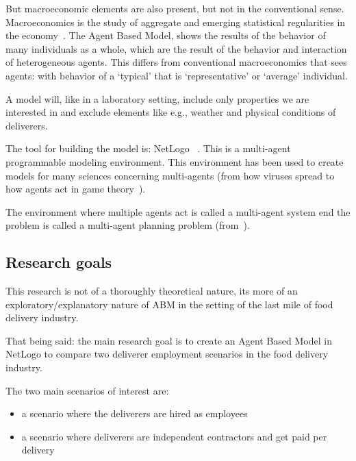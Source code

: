 But macroeconomic elements are also present, but not in the conventional sense.
Macroeconomics is the study of aggregate and emerging statistical regularities in the economy~\cite{cincotti2022we}.
The Agent Based Model, shows the results of the behavior of many individuals as a whole, which are the result of the behavior and interaction of heterogeneous agents.
This differs from conventional macroeconomics that sees agents: with behavior of a `typical' that is `representative' or `average' individual.

A model will, like in a laboratory setting, include only properties we are interested in and exclude elements like e.g., weather and physical conditions of deliverers.

The tool for building the model is: NetLogo ~\cite{NetLogo2024}.
This is a multi-agent programmable modeling environment.
This environment has been used to create models for many sciences concerning multi-agents (from how viruses spread to how agents act in game theory~\cite{r2019agent}).

The environment where multiple agents act is called a multi-agent system end the problem is called a multi-agent planning problem (from~\cite{russell2016artificial}).

\subsection{Research goals}\label{subsec:research-goals}
This research is not of a thoroughly theoretical nature, its more of an exploratory/explanatory nature of ABM in the setting of the last mile of food delivery industry.

That being said: the main research goal is to create an Agent Based Model in NetLogo to compare two deliverer employment scenarios in the food delivery industry.

The two main scenarios of interest are:
\begin{itemize}
    \item a scenario where the deliverers are hired as employees
    \item a scenario where deliverers are independent contractors and get paid per delivery
\end{itemize}




